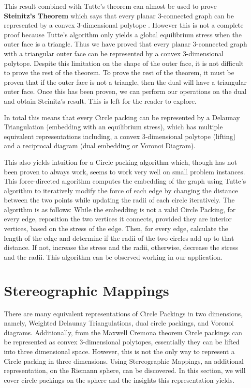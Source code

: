 \documentclass[11pt]{article}
\begin{document}
 This result combined with Tutte's theorem can almost be used to prove \textbf{Steinitz's Theorem} which says that every planar 3-connected graph can be represented by a convex 3-dimensional polytope \cite{realizationSpaces}. However this is not a complete proof because Tutte's algorithm only yields a global equilibrium stress when the outer face is a triangle. Thus we have proved that every planar 3-connected graph with a triangular outer face can be represented by a convex 3-dimensional polytope. Despite this limitation on the shape of the outer face, it is not difficult to prove the rest of the theorem. To prove the rest of the theorem, it must be proven that if the outer face is not a triangle, then the dual will have a triangular outer face. Once this has been proven, we can perform our operations on the dual and obtain Steinitz's result. This is left for the reader to explore.
 
 In total this means that every Circle packing can be represented by a Delaunay Triangulation (embedding with an equilibrium stress), which has multiple equivalent representations including, a convex 3-dimensional polytope (lifting) and a reciprocal diagram (dual embedding or Voronoi Diagram). 

This also yields intuition for a Circle packing algorithm which, though has not been proven to always work, seems to work very well on small problem instances. This force-directed algorithm computes the embedding of the graph using Tutte's algorithm to iteratively modify the force of each edge by changing the distance between the two points while updating the radii of each circle iteratively. The algorithm is as follows: While the embedding is not a valid Circle Packing, for every edge, reposition the two vertices it connects, provided they are interior vertices, based on the stress of the edge. Then, for every edge, calculate the length of the edge and determine if the radii of the two circles add up to that distance. If not, increase the stress and the radii, otherwise, decrease the stress and the radii. This algorithm can be observed working in our application.
 
\section{Stereographic Mappings}
There are many equivalent representations of Circle Packings in two dimensions, namely, Weighted Delaunay Triangulations, dual circle packings, and Voronoi diagrams. Additionally, from the Maxwell Cremona theorem Circle packings can be represented as convex 3-dimensional polytopes, essentially they can be lifted into three dimensional space. However, this is not the only way to represent a Circle packing in three dimensions. Using Stereographic Mappings, an additional representation, on the Riemann sphere,  can be discovered. In this section, we will cover circle packings on the sphere and the insights this representation yields.
\end{document}
